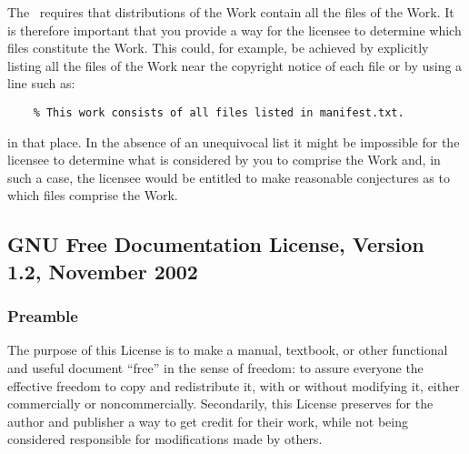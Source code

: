 \begin{LPPLicense}
  \label{LPPL:Recommendations}


  The \LPPL\ requires that distributions of the Work contain all the
  files of the Work.  It is therefore important that you provide a way
  for the licensee to determine which files constitute the Work.  This
  could, for example, be achieved by explicitly listing all the files
  of the Work near the copyright notice of each file or by using a
  line such as:
\begin{verbatim}
    % This work consists of all files listed in manifest.txt.
\end{verbatim}
  in that place.  In the absence of an unequivocal list it might be
  impossible for the licensee to determine what is considered by you
  to comprise the Work and, in such a case, the licensee would be
  entitled to make reasonable conjectures as to which files comprise
  the Work.

\end{LPPLicense}




\subsection{GNU Free Documentation License, Version 1.2, November 2002}
\label{label_fdl}



\subsubsection{Preamble}

The purpose of this License is to make a manual, textbook, or other
functional and useful document ``free'' in the sense of freedom: to
assure everyone the effective freedom to copy and redistribute it,
with or without modifying it, either commercially or noncommercially.
Secondarily, this License preserves for the author and publisher a way
to get credit for their work, while not being considered responsible
for modifications made by others.

